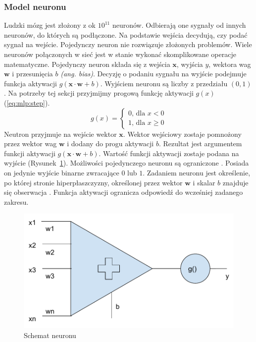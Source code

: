 \documentclass[a4paper,12pt,twoside,openany]{report}
\newcommand{\ang}[1]{\textit{(ang. #1)}}
\newcommand{\Rys}[1]{(Rysunek~\ref{#1})}
\newcommand{\Eq}[1]{(\ref{#1})}
\renewcommand{\vec}[1]{\bm{#1}}
\begin{document}
\subsubsection{Model neuronu}
Ludzki mózg jest złożony z ok $10^{11}$ neuronów.
Odbierają one sygnały od innych neuronów, do których są podłączone.
Na podstawie wejścia decydują, czy podać sygnał na wejście.
Pojedynczy neuron nie rozwiązuje złożonych problemów.
Wiele neuronów połączonych w sieć jest w stanie wykonać skomplikowane operacje matematyczne.
Pojedynczy neuron składa się z wejścia $\vec{x}$, wyjścia $y$, wektora wag $\vec{w}$ i przesunięcia $b$ \ang{bias}.
Decyzję o podaniu sygnału na wyjście podejmuje funkcja aktywacji $g(\vec{x} \cdot \vec{w} + b)$.
Wyjściem neuronu są liczby z przedziału $(0, 1)$.
Na potrzeby tej sekcji przyjmijmy progową funkcję aktywacji $g(x)$ \Eq{eq:mlp:step}.
\begin{equation}
	\label{eq:mlp:step}
g(x)={\begin{cases}0{\text{, dla }}x<0\\1{\text{, dla }}x\geq 0\end{cases}}
\end{equation}
Neutron przyjmuje na wejście wektor $\vec{x}$.
Wektor wejściowy zostaje pomnożony przez wektor wag $\vec{w}$ i dodany do progu aktywacji $b$.
Rezultat jest argumentem funkcji aktywacji  $g(\vec{x} \cdot \vec{w} + b)$.
Wartość funkcji aktywacji zostaje podana na wyjście \Rys{rys:mlp:neuron}.
Możliwości pojedynczego neuronu są ograniczone \cite{Jeon2018}.
Posiada on jedynie wyjście binarne zwracające $0$ lub $1$. 
Zadaniem neuronu jest określenie, po której stronie hiperpłaszczyzny, 
określonej przez wektor $\vec w$ i skalar $b$ znajduje się obserwacja \cite{Gurgen2017}.
Funkcja aktywacji ogranicza odpowiedź do wcześniej zadanego zakresu.
\begin{figure}[h]
	\centering
	\includegraphics[width=\textwidth]{neuron}
	\caption{Schemat neuronu}
	\label{rys:mlp:neuron}
\end{figure}
\end{document}
